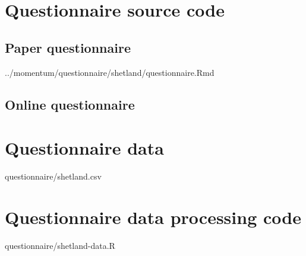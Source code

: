 \documentclass[oneside]{book}
\newcommand{\includeR}[1]{#1}
\begin{document}
\section{Questionnaire source code}
\label{app:questionnairecode}
\subsection{Paper questionnaire}

\includeR{../momentum/questionnaire/shetland/questionnaire.Rmd}
\subsection{Online questionnaire}

\section{Questionnaire data}
\includeR{questionnaire/shetland.csv}

\section{Questionnaire data processing code}
\label{app:questionnairedatacode}

\includeR{questionnaire/shetland-data.R}
\end{document}
